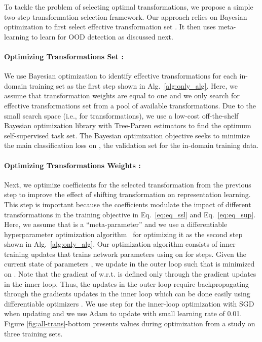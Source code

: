 \documentclass[letterpaper]{article} \usepackage{aaai22}  \usepackage{times}  \usepackage{helvet}  \usepackage{courier}  \usepackage[hyphens]{url}  \usepackage{graphicx} \urlstyle{rm} \def\UrlFont{\rm}  \usepackage{natbib}  \usepackage{caption} \DeclareCaptionStyle{ruled}{labelfont=normalfont,labelsep=colon,strut=off} \frenchspacing  \setlength{\pdfpagewidth}{8.5in}  \setlength{\pdfpageheight}{11in}
\begin{document}
To tackle the problem of selecting optimal transformations, we propose a simple two-step transformation selection framework. Our approach relies on Bayesian optimization to first select effective transformation set . It then uses meta-learning to learn  for OOD detection as discussed next.




\paragraph{Optimizing Transformations Set :} We use Bayesian optimization to identify effective transformations for each in-domain training set as the first step shown in Alg.~\ref{alg:only_alg}. Here, we assume that transformation weights  are equal to one and we only search for effective transformations set from a pool of available transformations. Due to the small  search space (i.e.,  for  transformations), we use a low-cost off-the-shelf Bayesian optimization library \cite{akiba2019optuna} with Tree-Parzen estimators to find the optimum self-supervised task set. 
The Bayesian optimization objective seeks to minimize the main classification loss  on , the validation set for the in-domain training data. 


\paragraph{Optimizing Transformations Weights :} Next, we optimize  coefficients for the selected transformation from the previous step to improve the effect of shifting transformation on representation learning. 
This step is important because the  coefficients modulate the impact of different transformations in the training objective in Eq.~\ref{eq:eq_ssl} and Eq.~\ref{eq:eq_sup}. 
Here, we assume that  is a ``meta-parameter'' and we use a differentiable hyperparameter optimization algorithm~\cite{maclaurin2015gradient} for optimizing it as the second step shown in Alg.~\ref{alg:only_alg}. 
Our optimization algorithm consists of inner training updates that trains network parameters  using  on  for  steps. 
Given the current state of parameters , we update  in the outer loop such that  is minimized on . 
Note that the gradient of  w.r.t.  is defined only through the gradient updates in the inner loop. Thus, the  updates in the outer loop require backpropagating through the gradients updates in the inner loop which can be done easily using differentiable optimizers \cite{grefenstette2019generalized}.
We use  step for the inner-loop optimization with SGD when updating  and we use Adam \cite{kingma2014adam} to update  with small  learning rate of 0.01. 
Figure \ref{fig:all-trans}-bottom presents  values during optimization from a study on three training sets. 
\end{document}
